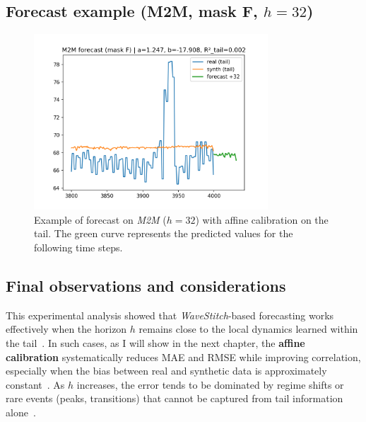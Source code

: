 \subsection{Forecast example (M2M, mask F, \texorpdfstring{$h{=}32$}{h=32})}
\begin{figure}[H]
\centering
\includegraphics[width=0.78\textwidth]{images/M2M_forecast_32_cal.png}
\caption{Example of forecast on \emph{M2M} ($h{=}32$) with affine calibration on the tail. The green curve represents the predicted values for the following time steps.}
\label{fig:m2m_forecast_cal}
\end{figure}

\subsection{Final observations and considerations}
This experimental analysis showed that \emph{WaveStitch}-based forecasting works effectively when the horizon $h$ remains close to the local dynamics learned within the tail~\cite{wavestitch,tashiro2021csdi}.  
In such cases, as I will show in the next chapter, the \textbf{affine calibration} systematically reduces MAE and RMSE while improving correlation, especially when the bias between real and synthetic data is approximately constant~\cite{bishop2006pattern,box2015time}.  
As $h$ increases, the error tends to be dominated by regime shifts or rare events (peaks, transitions) that cannot be captured from tail information alone~\cite{shumway2017time}.

